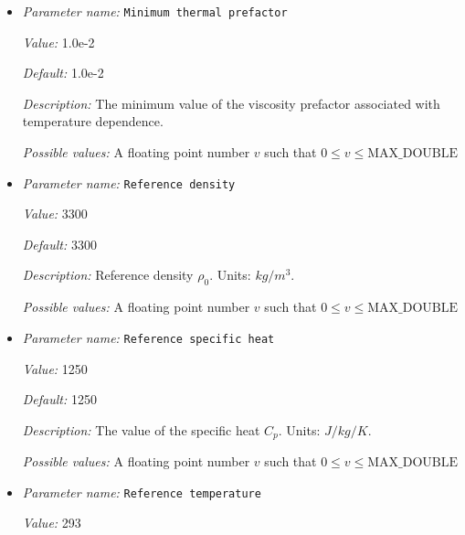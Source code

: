 \begin{itemize}
{\it Default:} 1.0e2


{\it Description:} The maximum value of the viscosity prefactor associated with temperature dependence.


{\it Possible values:} A floating point number $v$ such that $0 \leq v \leq \text{MAX\_DOUBLE}$
\item {\it Parameter name:} {\tt Minimum thermal prefactor}
\label{parameters:Material model/Simple model/Minimum thermal prefactor}


{\it Value:} 1.0e-2


{\it Default:} 1.0e-2


{\it Description:} The minimum value of the viscosity prefactor associated with temperature dependence.


{\it Possible values:} A floating point number $v$ such that $0 \leq v \leq \text{MAX\_DOUBLE}$
\item {\it Parameter name:} {\tt Reference density}
\label{parameters:Material model/Simple model/Reference density}


{\it Value:} 3300


{\it Default:} 3300


{\it Description:} Reference density $\rho_0$. Units: $kg/m^3$.


{\it Possible values:} A floating point number $v$ such that $0 \leq v \leq \text{MAX\_DOUBLE}$
\item {\it Parameter name:} {\tt Reference specific heat}
\label{parameters:Material model/Simple model/Reference specific heat}


{\it Value:} 1250


{\it Default:} 1250


{\it Description:} The value of the specific heat $C_p$. Units: $J/kg/K$.


{\it Possible values:} A floating point number $v$ such that $0 \leq v \leq \text{MAX\_DOUBLE}$
\item {\it Parameter name:} {\tt Reference temperature}
\label{parameters:Material model/Simple model/Reference temperature}


{\it Value:} 293



\end{itemize}
